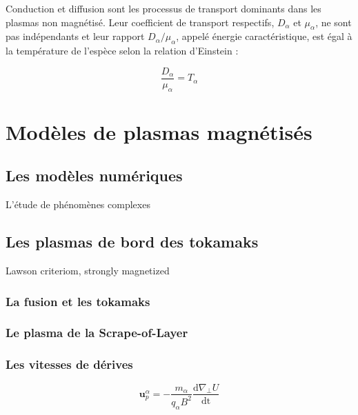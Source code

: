 \begin{refsection}
Conduction et diffusion sont les processus de transport dominants dans les
plasmas non magnétisé. Leur coefficient de transport respectifs, $D_\alpha$ et
$\mu_\alpha$, ne sont pas indépendants et leur rapport $D_\alpha/\mu_\alpha$,
appelé énergie caractéristique, est égal à la température de l'espèce selon la relation
d'Einstein :
 
\begin{equation}
    \frac{D_\alpha}{\mu_\alpha}=T_\alpha
\end{equation}
 
\section{Modèles de plasmas magnétisés}
\subsection{Les modèles numériques}
L'étude de phénomènes complexes
%

\subsection{Les plasmas de bord des tokamaks}
Lawson criteriom, strongly magnetized
\subsubsection{La fusion et les tokamaks}
\subsubsection{Le plasma de la Scrape-of-Layer}
\subsubsection{Les vitesses de dérives}

\label{vitessesDerive}
\begin{equation}
\label{1-vitessePol}
\mathbf{u}_p^\alpha=-\frac{m_\alpha}{q_\alpha B^2}\frac{\text{d}\nabla_\perp
U}{\text{dt}}
\end{equation}




\end{refsection}
